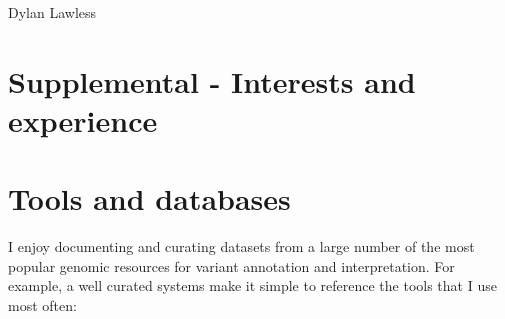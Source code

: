 \documentclass[11pt,a4paper]{article}
\begin{document}
\begin{cv}{Dylan Lawless}
\clearpage
\setcounter{page}{1}
\setlength\parindent{0pt}
\setlength{\parskip}{1em}
\section*{Supplemental - Interests and experience}

\section*{Tools and databases}
I enjoy documenting and curating datasets from a large number of the most popular genomic resources for variant annotation and interpretation.
For example, a well curated systems make it simple to reference the tools that I use most often:


\end{cv}
\end{document}
